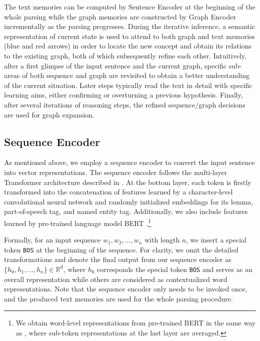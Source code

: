\documentclass[11pt,a4paper]{article}
\begin{document}
	The text memories can be computed by Sentence Encoder at the beginning of the whole parsing while the graph memories are constructed by Graph Encoder incrementally as the parsing progresses. During the iterative inference, a semantic representation of current state is used to attend to both graph and text memories (blue and red arrows) in order to locate the new concept and obtain its relations to the existing graph, both of which subsequently refine each other. Intuitively, after a first glimpse of the input sentence and the current graph, specific sub-areas of both sequence and graph are revisited to obtain a better understanding of the current situation. Later steps typically read the text in detail with specific learning aims, either confirming or overturning a previous hypothesis. Finally, after several iterations of reasoning steps, the refined sequence/graph decisions are used for graph expansion.
	\subsection{Sequence Encoder}
	As mentioned above, we employ a sequence encoder to convert the input sentence into vector representations. The sequence encoder follows the multi-layer Transformer architecture described in . At the bottom layer, each token is firstly transformed into the concatenation of features learned by a character-level convolutional neural network \cite[charCNN,][]{kim2016character} and randomly initialized embeddings for its lemma, part-of-speech tag, and named entity tag. Additionally, we also include features learned by pre-trained language model BERT \cite{devlin-etal-2019-bert}.\footnote{We obtain word-level representations from pre-trained BERT in the same way as , where sub-token representations at the last layer are averaged.}
	
	Formally, for an input sequence $w_1, w_2, \ldots, w_n$ with length $n$, we insert a special token \texttt{BOS} at the beginning of the sequence. For clarity, we omit the detailed transformations \cite{vaswani2017attention} and denote the final output from our sequence encoder as $\{h_0, h_1, \ldots, h_n\} \in\mathbb{R}^d$, where $h_0$ corresponds the special token \texttt{BOS} and serves as an overall representation while others are considered as contextualized word representations. Note that the sequence encoder only needs to be invoked once, and the produced text memories are used for the whole parsing procedure.
\end{document}
